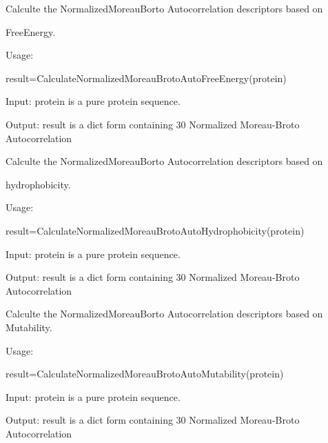 \documentclass[letterpaper,10pt,english]{sphinxmanual}
\begin{document}
\begin{fulllineitems}
\label{reference/Autocorrelation:Autocorrelation.CalculateNormalizedMoreauBrotoAutoFreeEnergy}
Calculte the NormalizedMoreauBorto Autocorrelation descriptors based on

FreeEnergy.

Usage:

result=CalculateNormalizedMoreauBrotoAutoFreeEnergy(protein)

Input: protein is a pure protein sequence.

Output: result is a dict form containing 30 Normalized Moreau-Broto Autocorrelation

\end{fulllineitems}


\begin{fulllineitems}
\label{reference/Autocorrelation:Autocorrelation.CalculateNormalizedMoreauBrotoAutoHydrophobicity}
Calculte the NormalizedMoreauBorto Autocorrelation descriptors based on

hydrophobicity.

Usage:

result=CalculateNormalizedMoreauBrotoAutoHydrophobicity(protein)

Input: protein is a pure protein sequence.

Output: result is a dict form containing 30 Normalized Moreau-Broto Autocorrelation

\end{fulllineitems}


\begin{fulllineitems}
\label{reference/Autocorrelation:Autocorrelation.CalculateNormalizedMoreauBrotoAutoMutability}
Calculte the NormalizedMoreauBorto Autocorrelation descriptors based on Mutability.

Usage:

result=CalculateNormalizedMoreauBrotoAutoMutability(protein)

Input: protein is a pure protein sequence.

Output: result is a dict form containing 30 Normalized Moreau-Broto Autocorrelation

\end{fulllineitems}
\end{document}
